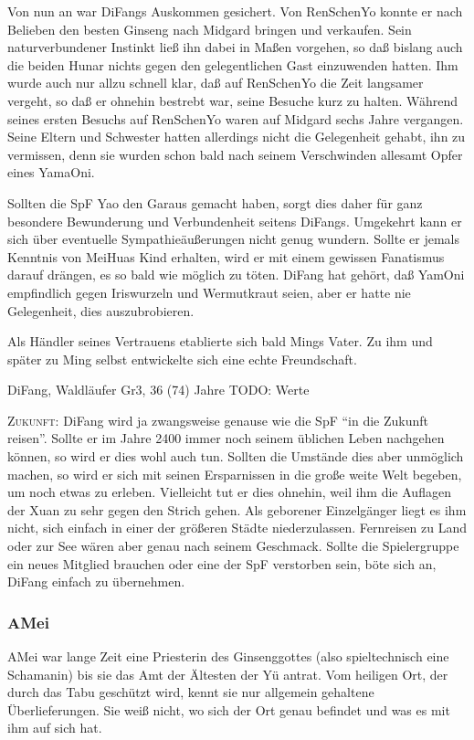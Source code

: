 \documentclass[
a4paper,
twoside,
DIV=calc,
BCOR=4mm,
fontsize=9pt,
twocolumn=on,
titlepage=on,
parskip=half
]{scrartcl}
\begin{document}
Von nun an war DiFangs Auskommen gesichert. Von RenSchenYo konnte er
nach Belieben den besten Ginseng nach Midgard bringen und
verkaufen. Sein naturverbundener Instinkt ließ ihn dabei in Maßen
vorgehen, so daß bislang auch die beiden Hunar nichts gegen den
gelegentlichen Gast einzuwenden hatten. Ihm wurde auch nur allzu
schnell klar, daß auf RenSchenYo die Zeit langsamer vergeht, so daß er
ohnehin bestrebt war, seine Besuche kurz zu halten. Während seines
ersten Besuchs auf RenSchenYo waren auf Midgard sechs Jahre
vergangen. Seine Eltern und Schwester hatten allerdings nicht die
Gelegenheit gehabt, ihn zu vermissen, denn sie wurden schon bald nach
seinem Verschwinden allesamt Opfer eines YamaOni.

Sollten die SpF Yao den Garaus gemacht haben, sorgt dies daher für
ganz besondere Bewunderung und Verbundenheit seitens
DiFangs. Umgekehrt kann er sich über eventuelle Sympathieäußerungen
nicht genug wundern. Sollte er jemals Kenntnis von MeiHuas Kind
erhalten, wird er mit einem gewissen Fanatismus darauf drängen, es so
bald wie möglich zu töten. DiFang hat gehört, daß YamOni empfindlich
gegen Iriswurzeln und Wermutkraut seien, aber er hatte nie
Gelegenheit, dies auszubrobieren.

Als Händler seines Vertrauens etablierte sich bald Mings Vater. Zu ihm
und später zu Ming selbst entwickelte sich eine echte Freundschaft.

DiFang, Waldläufer Gr3, 36 (74) Jahre
TODO: Werte

\textsc{Zukunft:} DiFang wird ja zwangsweise genause wie die SpF "`in
die Zukunft reisen"'. Sollte er im Jahre 2400 immer noch seinem
üblichen Leben nachgehen können, so wird er dies wohl auch
tun. Sollten die Umstände dies aber unmöglich machen, so wird er sich
mit seinen Ersparnissen in die große weite Welt begeben, um noch etwas
zu erleben. Vielleicht tut er dies ohnehin, weil ihm die Auflagen der
Xuan zu sehr gegen den Strich gehen. Als geborener Einzelgänger liegt
es ihm nicht, sich einfach in einer der größeren Städte
niederzulassen. Fernreisen zu Land oder zur See wären aber genau nach
seinem Geschmack. Sollte die Spielergruppe ein neues Mitglied brauchen
oder eine der SpF verstorben sein, böte sich an, DiFang einfach zu
übernehmen.

\subsubsection{AMei}

AMei war lange Zeit eine Priesterin des Ginsenggottes (also
spieltechnisch eine Schamanin) bis sie das Amt der Ältesten der Yü
antrat. Vom heiligen Ort, der durch das Tabu geschützt wird, kennt sie
nur allgemein gehaltene Überlieferungen. Sie weiß nicht, wo sich der
Ort genau befindet und was es mit ihm auf sich hat.
\end{document}
